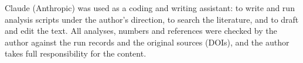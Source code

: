 Claude (Anthropic) was used as a coding and writing assistant: to write and run analysis scripts under the
author's direction, to search the literature, and to draft and edit the text. All analyses, numbers and references
were checked by the author against the run records and the original sources (DOIs), and the author takes full
responsibility for the content.

